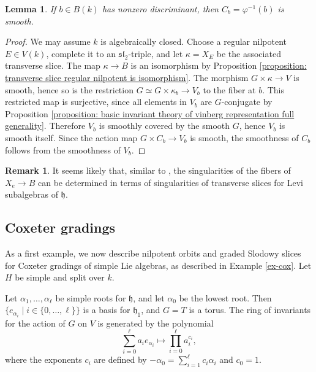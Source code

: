 \documentclass{article} %
\newtheorem{lemma}[proposition]{Lemma}
\numberwithin{equation}{section}
\theoremstyle{definition}
\newtheorem{remark}[proposition]{Remark}
\newcommand{\frakh}{\mathfrak h}
\newcommand{\fraksl}{\mathfrak{sl}}
\newcommand{\al}{\alpha}
\begin{document}
\begin{lemma}\label{lemma: nonzero discriminant implies smooth curve}
    If $b\in B(k)$ has nonzero discriminant, then $C_b = \varphi^{-1}(b)$ is smooth.
\end{lemma}
\begin{proof}
    We may assume $k$ is algebraically closed.
    Choose a regular nilpotent $E\in V(k)$, complete it to an $\fraksl_2$-triple, and let $\kappa = X_E$ be the associated transverse slice.
    The map $\kappa \to B$ is an isomorphism by Proposition \ref{proposition: transverse slice regular nilpotent is isomorphism}.
    The morphism $G\times \kappa \rightarrow V$ is smooth, hence so is the restriction $G\simeq G\times \kappa_b\rightarrow V_b$ to the fiber at $b$.
    This restricted map is surjective, since all elements in $V_b$ are $G$-conjugate by Proposition \ref{proposition: basic invariant theory of vinberg representation full generality}.
    Therefore $V_b$ is smoothly covered by the smooth $G$, hence $V_b$ is smooth itself.
    Since the action map $G\times C_b \rightarrow V_b$ is smooth, the smoothness of $C_b$ follows from the smoothness of $V_b$.
\end{proof}



\begin{remark}
    It seems likely that, similar to \cite[Proposition 4.5]{Thorne-thesis}, the singularities of the fibers of $X_e\rightarrow B$ can be determined in terms of singularities of transverse slices for Levi subalgebras of $\frakh$.
\end{remark}




\subsection{Coxeter gradings}\label{subsection: Coxeter gradings}


As a first example, we now describe nilpotent orbits and graded Slodowy slices for Coxeter gradings of simple Lie algebras, as described in Example \ref{ex-cox}. Let $H$ be simple and split over $k$. 


Let $\al_1, \dots, \al_\ell$ be simple roots for $\frakh$, and let $\al_0$ be the lowest root. Then $\{e_{\al_i} \mid i \in \{0, \dots, \ell\}\}$ is a basis for $\frakh_1$, and $G = T$ is a torus. The ring of invariants for the action of $G$ on $V$ is generated by the polynomial
\begin{equation*}
\sum_{i = 0}^\ell a_ie_{\al_i} \mapsto \prod_{i = 0}^\ell a_i^{c_i},
\end{equation*}
where the exponents $c_i$ are defined by $-\al_0 = \sum_{i = 1}^\ell c_i\al_i$ and $c_0 = 1$. 
\end{document}
